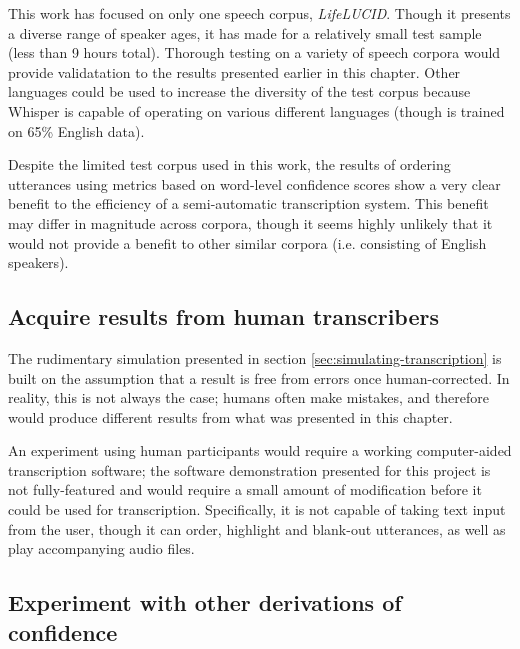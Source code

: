 This work has focused on only one speech corpus, \emph{LifeLUCID}\cite{lifelucid}.
Though it presents a diverse range of speaker ages, it has made for a relatively small test sample (less than 9 hours total).
Thorough testing on a variety of speech corpora would provide validatation to the results presented earlier in this chapter.
Other languages could be used to increase the diversity of the test corpus because Whisper is capable of operating on various different languages (though is trained on 65\% English data\cite{whisper}).

Despite the limited test corpus used in this work, the results of ordering utterances using metrics based on word-level confidence scores show a very clear benefit to the efficiency of a semi-automatic transcription system.
This benefit may differ in magnitude across corpora, though it seems highly unlikely that it would not provide a benefit to other similar corpora (i.e. consisting of English speakers).

\subsection{Acquire results from human transcribers}

The rudimentary simulation presented in section \ref{sec:simulating-transcription} is built on the assumption that a result is free from errors once human-corrected.
In reality, this is not always the case; humans often make mistakes, and therefore would produce different results from what was presented in this chapter.

An experiment using human participants would require a working computer-aided transcription software; the software demonstration presented for this project is not fully-featured and would require a small amount of modification before it could be used for transcription.
Specifically, it is not capable of taking text input from the user, though it can order, highlight and blank-out utterances, as well as play accompanying audio files.

\subsection{Experiment with other derivations of confidence}

